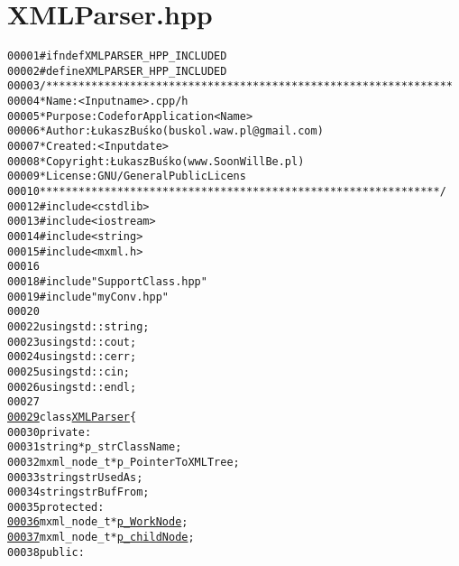 \hypertarget{XMLParser_8hpp_source}{
\section{XMLParser.hpp}
}


\begin{footnotesize}\begin{alltt}
00001 \textcolor{preprocessor}{#ifndef XMLPARSER\_HPP\_INCLUDED}
00002 \textcolor{preprocessor}{}\textcolor{preprocessor}{#define XMLPARSER\_HPP\_INCLUDED}
00003 \textcolor{preprocessor}{}\textcolor{comment}{/***************************************************************}
00004 \textcolor{comment}{ * Name:      <Input name>.cpp/h}
00005 \textcolor{comment}{ * Purpose:   Code for Application <Name>}
00006 \textcolor{comment}{ * Author:    Łukasz Buśko (buskol.waw.pl@gmail.com)}
00007 \textcolor{comment}{ * Created:   <Input date>}
00008 \textcolor{comment}{ * Copyright: Łukasz Buśko (www.SoonWillBe.pl)}
00009 \textcolor{comment}{ * License:   GNU / General Public Licens}
00010 \textcolor{comment}{ **************************************************************/}
00012 \textcolor{preprocessor}{#include <cstdlib>}
00013 \textcolor{preprocessor}{#include <iostream>}
00014 \textcolor{preprocessor}{#include <string>}
00015 \textcolor{preprocessor}{#include <mxml.h>}
00016 
00018 \textcolor{preprocessor}{#include "SupportClass.hpp"}
00019 \textcolor{preprocessor}{#include "myConv.hpp"}
00020 
00022 \textcolor{keyword}{using} std::string;
00023 \textcolor{keyword}{using} std::cout;
00024 \textcolor{keyword}{using} std::cerr;
00025 \textcolor{keyword}{using} std::cin;
00026 \textcolor{keyword}{using} std::endl;
00027 
\hypertarget{XMLParser_8hpp_source_l00029}{}\hyperlink{classXMLParser}{00029} \textcolor{keyword}{class }\hyperlink{classXMLParser}{XMLParser}\{
00030     \textcolor{keyword}{private}:
00031         \textcolor{keywordtype}{string} *p\_strClassName; 
00032         mxml\_node\_t *p\_PointerToXMLTree; 
00033         \textcolor{keywordtype}{string} strUsedAs;
00034         \textcolor{keywordtype}{string} strBufFrom;
00035     \textcolor{keyword}{protected}:
\hypertarget{XMLParser_8hpp_source_l00036}{}\hyperlink{classXMLParser_abb381f2220e4b0130644494cdd3a5454}{00036}         mxml\_node\_t *\hyperlink{classXMLParser_abb381f2220e4b0130644494cdd3a5454}{p_WorkNode}; 
\hypertarget{XMLParser_8hpp_source_l00037}{}\hyperlink{classXMLParser_a479311b5147f4f8ed5559bafb2cc1c69}{00037}         mxml\_node\_t *\hyperlink{classXMLParser_a479311b5147f4f8ed5559bafb2cc1c69}{p_childNode}; 
00038     \textcolor{keyword}{public}:

\end{alltt}
\end{footnotesize}
